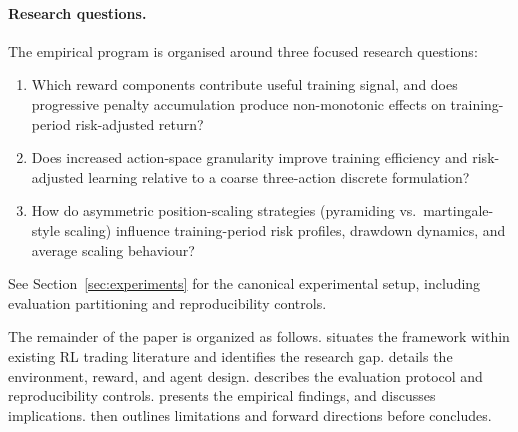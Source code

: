 \paragraph{Research questions.}
The empirical program is organised around three focused research questions:
\begin{enumerate}[leftmargin=1.8em, label=\textbf{RQ\arabic*.}]
    \item Which reward components contribute useful training signal, and does progressive penalty accumulation produce non-monotonic effects on training-period risk-adjusted return?
    \item Does increased action-space granularity improve training efficiency and risk-adjusted learning relative to a coarse three-action discrete formulation?
    \item How do asymmetric position-scaling strategies (pyramiding vs.\ martingale-style scaling) influence training-period risk profiles, drawdown dynamics, and average scaling behaviour?
\end{enumerate}

See Section~\ref{sec:experiments} for the canonical experimental setup, including evaluation partitioning and reproducibility controls.

The remainder of the paper is organized as follows.  situates the framework within existing RL trading literature and identifies the research gap.  details the environment, reward, and agent design.  describes the evaluation protocol and reproducibility controls.  presents the empirical findings, and  discusses implications.  then outlines limitations and forward directions before  concludes.